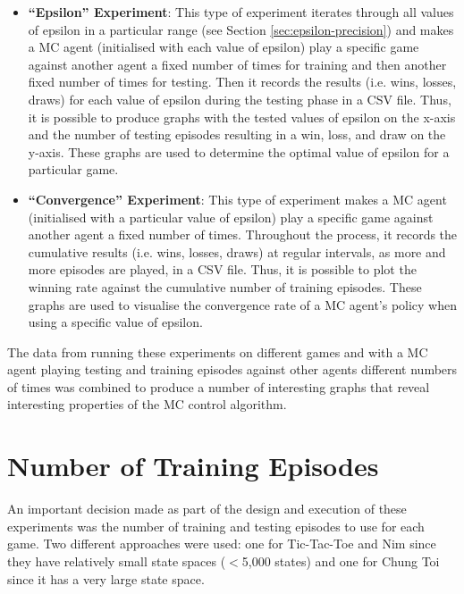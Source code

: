 \documentclass[11pt,a4paper]{report}
\begin{document}
\begin{itemize}

	\item \textbf{``Epsilon'' Experiment}: This type of experiment iterates through all values of epsilon in a particular range (see Section \ref{sec:epsilon-precision}) and makes a MC agent (initialised with each value of epsilon) play a specific game against another agent a fixed number of times for training and then another fixed number of times for testing. Then it records the results (i.e. wins, losses, draws) for each value of epsilon during the testing phase in a CSV file. Thus, it is possible to produce graphs with the tested values of epsilon on the x-axis and the number of testing episodes resulting in a win, loss, and draw on the y-axis. These graphs are used to determine the optimal value of epsilon for a particular game.

	\item \textbf{``Convergence'' Experiment}: This type of experiment makes a MC agent (initialised with a particular value of epsilon) play a specific game against another agent a fixed number of times. Throughout the process, it records the cumulative results (i.e. wins, losses, draws) at regular intervals, as more and more episodes are played, in a CSV file. Thus, it is possible to plot the winning rate against the cumulative number of training episodes. These graphs are used to visualise the convergence rate of a MC agent's policy when using a specific value of epsilon.

\end{itemize}

The data from running these experiments on different games and with a MC agent playing testing and training episodes against other agents different numbers of times was combined to produce a number of interesting graphs that reveal interesting properties of the MC control algorithm.


\section{Number of Training Episodes}

An important decision made as part of the design and execution of these experiments was the number of training and testing episodes to use for each game. Two different approaches were used: one for Tic-Tac-Toe and Nim since they have relatively small state spaces ($<$5,000 states) and one for Chung Toi since it has a very large state space.
\end{document}
